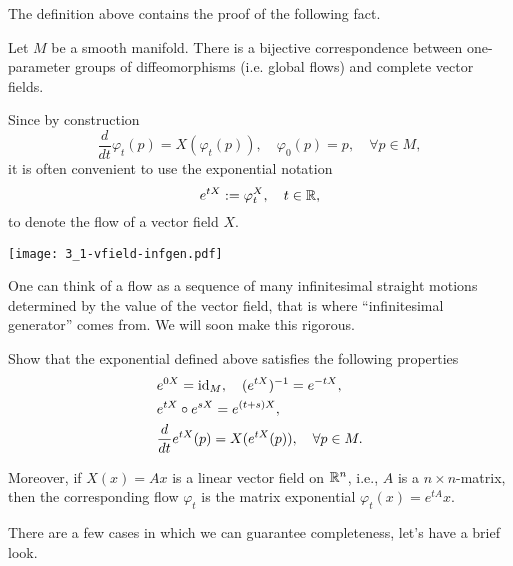 The definition above contains the proof of the following fact.
\begin{proposition}
  Let $M$ be a smooth manifold. There is a bijective correspondence between one-parameter groups of diffeomorphisms (i.e. global flows) and complete vector fields.
\end{proposition}

\begin{notation}
  Since by construction
  \begin{equation}
    \frac{d}{d t}\varphi_t(p) = X(\varphi_t(p)), \quad
    \varphi_0(p) = p, \quad \forall p\in M,
  \end{equation}
  it is often convenient to use the exponential notation
  \begin{equation}
    e^{t X} := \varphi^X_t, \quad t\in\mathbb{R},
  \end{equation}
  to denote the flow of a vector field $X$.
\end{notation}

\begin{marginfigure}
  \texttt{[image: 3\_1-vfield-infgen.pdf]}%
  \caption{One can think of a flow as a sequence of many infinitesimal straight motions determined by the value of the vector field, that is where ``infinitesimal generator'' comes from. We will soon make this rigorous.}%
  \label{fig:3_1-vfield-infgen}
\end{marginfigure}

\begin{exercise}
  Show that the exponential defined above satisfies the following properties
  \begin{align}
     & e^{0X} = \operatorname{id}_M, \quad (e^{tX})^{-1} = e^{-tX},                 \\
     & e^{t X}\circ e^{s X}= e^{(t+s)X},                              \\
     & \frac{d}{d t} e^{tX} (p) = X(e^{tX}(p)), \quad \forall p\in M.
  \end{align}

  Moreover, if $X(x) = Ax$ is a linear vector field on $\mathbb{R}^n$, i.e., $A$ is a $n\times n$-matrix, then the corresponding flow $\varphi_t$ is the matrix exponential $\varphi_t(x) = e^{tA}x$.
\end{exercise}

There are a few cases in which we can guarantee completeness, let's have a brief look.

